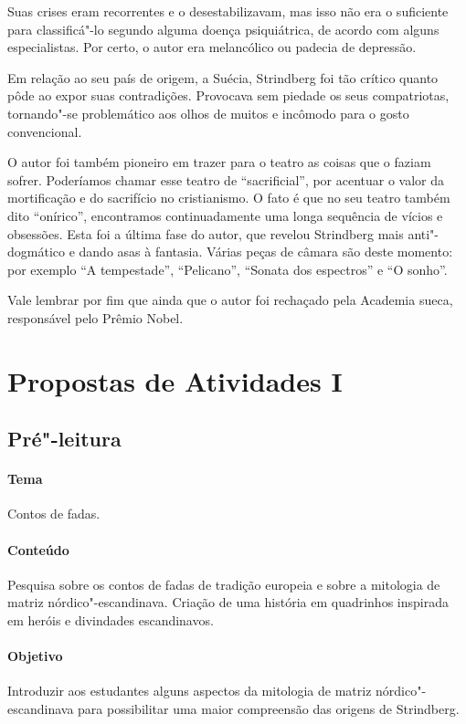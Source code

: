 \documentclass[12pt]{extarticle}
\begin{document}
Suas crises eram recorrentes e o desestabilizavam, mas isso não era o suficiente para classificá"-lo 
segundo alguma doença psiquiátrica, de acordo com alguns especialistas. 
Por certo, o autor era melancólico ou padecia de depressão.

Em relação ao seu país de origem, a Suécia, Strindberg foi tão 
crítico quanto pôde ao expor suas contradições.
Provocava sem piedade os seus compatriotas, tornando"-se problemático aos olhos de muitos e incômodo para o gosto convencional.

O autor foi também pioneiro em trazer para o teatro as coisas que o faziam sofrer. Poderíamos chamar esse teatro de ``sacrificial'', por acentuar o valor da mortificação e do sacrifício no cristianismo. 
O fato é que no seu teatro também dito ``onírico'', encontramos continuadamente uma longa sequência 
de vícios e obsessões. Esta foi a última fase do autor, que revelou Strindberg mais anti"-dogmático e dando asas à fantasia. Várias peças de câmara são deste momento: por exemplo ``A tempestade'', ``Pelicano'', ``Sonata dos espectros'' e ``O sonho''.


Vale lembrar por fim que ainda que o autor foi rechaçado pela Academia sueca, responsável pelo Prêmio Nobel.



\section{Propostas de Atividades I}


\subsection{Pré"-leitura}

\paragraph{Tema} Contos de fadas.

\paragraph{Conteúdo} Pesquisa sobre os contos de fadas de tradição europeia e sobre a mitologia de matriz nórdico"-escandinava. Criação de uma história em quadrinhos inspirada em heróis e divindades escandinavos.

\paragraph{Objetivo} Introduzir aos estudantes alguns aspectos da mitologia de matriz nórdico"-escandinava para possibilitar uma maior compreensão das origens de Strindberg.
\end{document}
